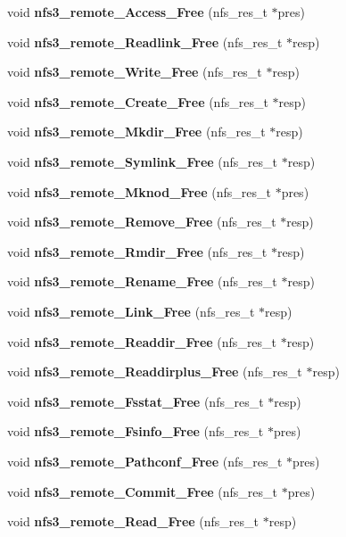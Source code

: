 \begin{CompactItemize}
\item 
void {\bf nfs3\_\-remote\_\-Access\_\-Free} (nfs\_\-res\_\-t $\ast$pres)
\item 
void {\bf nfs3\_\-remote\_\-Readlink\_\-Free} (nfs\_\-res\_\-t $\ast$resp)
\item 
void {\bf nfs3\_\-remote\_\-Write\_\-Free} (nfs\_\-res\_\-t $\ast$resp)
\item 
void {\bf nfs3\_\-remote\_\-Create\_\-Free} (nfs\_\-res\_\-t $\ast$resp)
\item 
void {\bf nfs3\_\-remote\_\-Mkdir\_\-Free} (nfs\_\-res\_\-t $\ast$resp)
\item 
void {\bf nfs3\_\-remote\_\-Symlink\_\-Free} (nfs\_\-res\_\-t $\ast$resp)
\item 
void {\bf nfs3\_\-remote\_\-Mknod\_\-Free} (nfs\_\-res\_\-t $\ast$pres)
\item 
void {\bf nfs3\_\-remote\_\-Remove\_\-Free} (nfs\_\-res\_\-t $\ast$resp)
\item 
void {\bf nfs3\_\-remote\_\-Rmdir\_\-Free} (nfs\_\-res\_\-t $\ast$resp)
\item 
void {\bf nfs3\_\-remote\_\-Rename\_\-Free} (nfs\_\-res\_\-t $\ast$resp)
\item 
void {\bf nfs3\_\-remote\_\-Link\_\-Free} (nfs\_\-res\_\-t $\ast$resp)
\item 
void {\bf nfs3\_\-remote\_\-Readdir\_\-Free} (nfs\_\-res\_\-t $\ast$resp)
\item 
void {\bf nfs3\_\-remote\_\-Readdirplus\_\-Free} (nfs\_\-res\_\-t $\ast$resp)
\item 
void {\bf nfs3\_\-remote\_\-Fsstat\_\-Free} (nfs\_\-res\_\-t $\ast$resp)
\item 
void {\bf nfs3\_\-remote\_\-Fsinfo\_\-Free} (nfs\_\-res\_\-t $\ast$pres)
\item 
void {\bf nfs3\_\-remote\_\-Pathconf\_\-Free} (nfs\_\-res\_\-t $\ast$pres)
\item 
void {\bf nfs3\_\-remote\_\-Commit\_\-Free} (nfs\_\-res\_\-t $\ast$pres)
\item 
void {\bf nfs3\_\-remote\_\-Read\_\-Free} (nfs\_\-res\_\-t $\ast$resp)
\end{CompactItemize}
